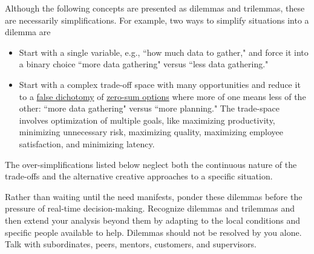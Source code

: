 Although the following concepts are presented as dilemmas and trilemmas, these are necessarily simplifications. For example, two ways to simplify situations into a dilemma are
\begin{itemize}
    \item Start with a single variable, e.g., ``how much data to gather," and force it into a binary choice ``more data gathering" versus ``less data gathering."
    
    \item Start with a complex trade-off space with many opportunities and reduce it to a \href{https://en.wikipedia.org/wiki/False_dilemma}{false dichotomy} 
    \iftoggle{WPinmargin}{ \marginpar{$>$Wikipedia: False\\dilemma}}{}
    of 
    \href{https://en.wikipedia.org/wiki/Zero-sum_thinking}{zero-sum options} where more of one means less of the other: 
    ``more data gathering" versus ``more planning." The  trade-space involves optimization of multiple goals, like maximizing productivity, minimizing unnecessary risk, maximizing quality, maximizing employee satisfaction, and minimizing latency. 
\end{itemize}
The over-simplifications listed below neglect both the continuous nature of the trade-offs and the alternative creative approaches to a specific situation. 





Rather than waiting until the need manifests, ponder these dilemmas before the pressure of real-time decision-making.  Recognize dilemmas and trilemmas and then extend your analysis beyond them by adapting to the local conditions and specific people available to help.
Dilemmas should not be resolved by you alone. Talk with subordinates, peers, mentors, customers, and supervisors.


